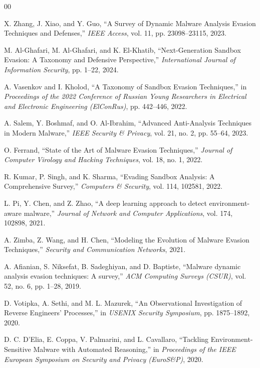 \documentclass{ieeeaccess}
\begin{document}
\begin{thebibliography}{00}

 X. Zhang, J. Xiao, and Y. Guo, ``A Survey of Dynamic Malware Analysis Evasion Techniques and Defenses,'' \textit{IEEE Access}, vol. 11, pp. 23098--23115, 2023.

 M. Al-Ghafari, M. Al-Ghafari, and K. El-Khatib, ``Next-Generation Sandbox Evasion: A Taxonomy and Defensive Perspective,'' \textit{International Journal of Information Security}, pp. 1--22, 2024.

 A. Vasenkov and I. Kholod, ``A Taxonomy of Sandbox Evasion Techniques,'' in \textit{Proceedings of the 2022 Conference of Russian Young Researchers in Electrical and Electronic Engineering (ElConRus)}, pp. 442--446, 2022.

 A. Salem, Y. Boshmaf, and O. Al-Ibrahim, ``Advanced Anti-Analysis Techniques in Modern Malware,'' \textit{IEEE Security \& Privacy}, vol. 21, no. 2, pp. 55--64, 2023.

 O. Ferrand, ``State of the Art of Malware Evasion Techniques,'' \textit{Journal of Computer Virology and Hacking Techniques}, vol. 18, no. 1, 2022.

 R. Kumar, P. Singh, and K. Sharma, ``Evading Sandbox Analysis: A Comprehensive Survey,'' \textit{Computers \& Security}, vol. 114, 102581, 2022.

 L. Pi, Y. Chen, and Z. Zhao, ``A deep learning approach to detect environment-aware malware,'' \textit{Journal of Network and Computer Applications}, vol. 174, 102898, 2021.

 A. Zimba, Z. Wang, and H. Chen, ``Modeling the Evolution of Malware Evasion Techniques,'' \textit{Security and Communication Networks}, 2021.

 A. Afianian, S. Niksefat, B. Sadeghiyan, and D. Baptiste, ``Malware dynamic analysis evasion techniques: A survey,'' \textit{ACM Computing Surveys (CSUR)}, vol. 52, no. 6, pp. 1--28, 2019.

 D. Votipka, A. Sethi, and M. L. Mazurek, ``An Observational Investigation of Reverse Engineers' Processes,'' in \textit{USENIX Security Symposium}, pp. 1875--1892, 2020.

 D. C. D’Elia, E. Coppa, V. Palmarini, and L. Cavallaro, ``Tackling Environment-Sensitive Malware with Automated Reasoning,'' in \textit{Proceedings of the IEEE European Symposium on Security and Privacy (EuroS\&P)}, 2020.


\end{thebibliography}
\end{document}
